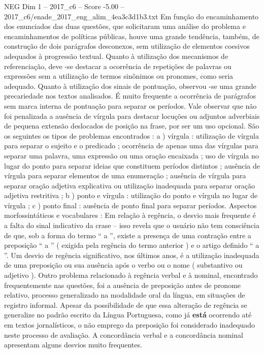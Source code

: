 \begin{textsample}{NEG Dim 1 – 2017\_c6 – Score -5.00 – 2017\_c6/enade\_2017\_eng\_alim\_4ea3c3d1b3.txt}
Em função do encaminhamento dos enunciados das duas questões, que solicitaram uma análise do problema e encaminhamentos de políticas públicas, houve uma grande tendência, também, de construção de dois parágrafos desconexos, sem utilização de elementos coesivos adequados à progressão textual.
Quanto à utilização dos mecanismos de referenciação, deve -se destacar a ocorrência de repetições de palavras ou expressões sem a utilização de termos sinônimos ou pronomes, como seria adequado.
Quanto à utilização dos sinais de pontuação, observou -se uma grande precariedade nos textos analisados.
É muito frequente a ocorrência de parágrafos sem marca interna de pontuação para separar os períodos.
Vale observar que não foi penalizada a ausência de vírgula para destacar locuções ou adjuntos adverbiais de pequena extensão deslocados de posição na frase, por ser um uso opcional.
São os seguintes os tipos de problemas encontrados : a ) vírgula : utilização de vírgula para separar o sujeito e o predicado ; ocorrência de apenas uma das vírgulas para separar uma palavra, uma expressão ou uma oração encaixada ; uso de vírgula no lugar do ponto para separar ideias que constituem períodos distintos ; ausência de vírgula para separar elementos de uma enumeração ; ausência de vírgula para separar oração adjetiva explicativa ou utilização inadequada para separar oração adjetiva restritiva ; b ) ponto e vírgula : utilização do ponto e vírgula no lugar de vírgula ; c ) ponto final : ausência de ponto final para separar períodos.
Aspectos morfossintáticos e vocabulares : Em relação à regência, o desvio mais frequente é a falta do sinal indicativo da crase – isso revela que o usuário não tem consciência de que, sob a forma do termo “ a ”, existe a presença de uma contração entre a preposição “ a ” ( exigida pela regência do termo anterior ) e o artigo definido “ a ”.
Um desvio de regência significativo, nos últimos anos, é a utilização inadequada de uma preposição ou sua ausência após o verbo ou o nome ( substantivo ou adjetivo ).
Outro problema relacionado à regência verbal e à nominal, encontrado frequentemente nas questões, foi a ausência de preposição antes de pronome relativo, processo generalizado na modalidade oral da língua, em situações de registro informal.
Apesar da possibilidade de que essa alteração de regência se generalize no padrão escrito da Língua Portuguesa, como já \textbf{está} ocorrendo até em textos jornalísticos, o não emprego da preposição foi considerado inadequado neste processo de avaliação.
A concordância verbal e a concordância nominal apresentam alguns desvios muito frequentes.

\end{textsample}
